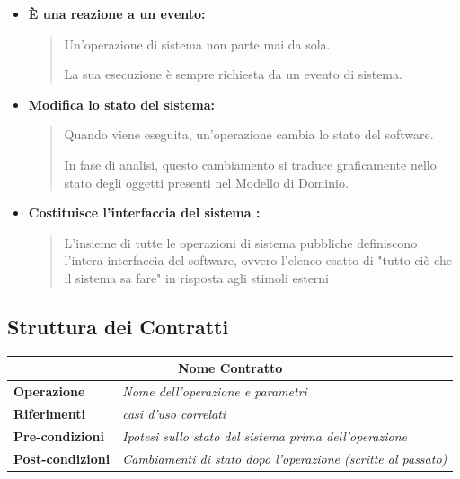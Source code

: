 \vspace{\baselineskip}

\begin{itemize}
    \item \textbf{È una reazione a un evento:}
    \begin{quote}
        Un'operazione di sistema non parte mai da sola. 
        
        La sua esecuzione è sempre richiesta da un evento di sistema.
    \end{quote}

    \item \textbf{Modifica lo stato del sistema:}
    \begin{quote}
        Quando viene eseguita, un'operazione cambia lo stato del software.
        
        In fase di analisi, questo cambiamento si traduce graficamente nello stato degli oggetti presenti nel Modello di Dominio.
    \end{quote}

    \item \textbf{Costituisce l'interfaccia del sistema :}
    \begin{quote}
        L'insieme di tutte le operazioni di sistema pubbliche definiscono l'intera interfaccia del software, ovvero l'elenco esatto di "tutto ciò che il sistema sa fare" in risposta agli stimoli esterni
    \end{quote}
\end{itemize}

\subsection{Struttura dei Contratti}

\vspace{\baselineskip}

\begin{center}
    \renewcommand{\arraystretch}{1.5} 

    \begin{tabularx}{\textwidth}{ l | X }
        \multicolumn{2}{c}{\textbf{Nome Contratto}} \\ \hline
        \textbf{Operazione} & \textit{Nome dell'operazione e parametri} \\
        \hline
        \textbf{Riferimenti} & \textit{casi d'uso correlati} \\
        \hline
        \textbf{Pre-condizioni} & \textit{Ipotesi sullo stato del sistema prima dell'operazione} \\
        \hline
        \textbf{Post-condizioni} & \textit{Cambiamenti di stato dopo l'operazione (scritte al passato)} \\
    \end{tabularx}
\end{center}

